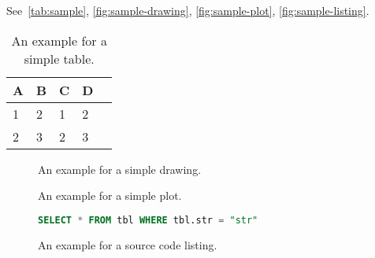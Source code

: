 See~\autoref{tab:sample}, \autoref{fig:sample-drawing}, \autoref{fig:sample-plot}, \autoref{fig:sample-listing}.

\begin{table}[htpb]
  \caption[Example table]{An example for a simple table.}\label{tab:sample}
  \centering
  \begin{tabular}{l l l ll}
    \toprule
      A & B & C & D \\
    \midrule
      1 & 2 & 1 & 2 \\
      2 & 3 & 2 & 3 \\
    \bottomrule
  \end{tabular}
\end{table}

\begin{figure}[htpb]
  \centering
  \caption[Example drawing]{An example for a simple drawing.}\label{fig:sample-drawing}
\end{figure}

\begin{figure}[htpb]
  \centering

  \exampleA
  \exampleB
  \caption[Example plot]{An example for a simple plot.}\label{fig:sample-plot}
\end{figure}

\begin{figure}[htpb]
  \begin{lstlisting}[language=SQL]
    SELECT * FROM tbl WHERE tbl.str = "str"
  \end{lstlisting}
  \caption[Example listing]{An example for a source code listing.}\label{fig:sample-listing}
\end{figure}


